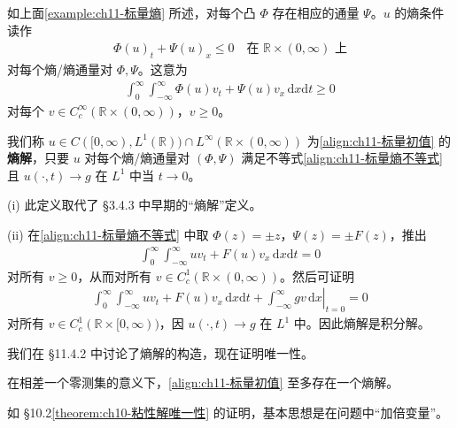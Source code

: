 \documentclass[../../main.tex]{subfiles}
\begin{document}
如上面\cref{example:ch11-标量熵} 所述，对每个凸 $\Phi$ 存在相应的通量 $\Psi$。$u$ 的熵条件读作
\begin{align*}
\Phi(u)_t+\Psi(u)_x\leqslant 0 \quad \text{在 } \mathbb{R}\times(0,\infty) \text{ 上}
\end{align*}
对每个熵/熵通量对 $\Phi,\Psi$。这意为
\begin{align}
\int_0^\infty\int_{-\infty}^\infty \Phi(u)v_t+\Psi(u)v_x\,\mathrm{d}x\mathrm{d}t\geqslant 0
\label{align:ch11-标量熵不等式}
\end{align}
对每个 $v\in C_c^\infty(\mathbb{R}\times(0,\infty))$，$v\geqslant 0$。

\begin{definition}\label{definition:ch11-标量熵解}
我们称 $u\in C([0,\infty),L^1(\mathbb{R}))\cap L^\infty(\mathbb{R}\times(0,\infty))$ 为\eqref{align:ch11-标量初值} 的\textbf{熵解}，只要 $u$ 对每个熵/熵通量对 $(\Phi,\Psi)$ 满足不等式\eqref{align:ch11-标量熵不等式} 且 $u(\cdot,t)\to g$ 在 $L^1$ 中当 $t\to 0$。
\end{definition}

\begin{remark}
(i) 此定义取代了 \S3.4.3 中早期的``熵解''定义。

(ii) 在\eqref{align:ch11-标量熵不等式} 中取 $\Phi(z)=\pm z$，$\Psi(z)=\pm F(z)$，推出
\begin{align*}
\int_0^\infty\int_{-\infty}^\infty uv_t+F(u)v_x\,\mathrm{d}x\mathrm{d}t=0
\end{align*}
对所有 $v\geqslant 0$，从而对所有 $v\in C_c^1(\mathbb{R}\times(0,\infty))$。然后可证明
\begin{align*}
\int_0^\infty\int_{-\infty}^\infty uv_t+F(u)v_x\,\mathrm{d}x\mathrm{d}t+\left.\int_{-\infty}^\infty gv\,\mathrm{d}x\right|_{t=0}=0
\end{align*}
对所有 $v\in C_c^1(\mathbb{R}\times[0,\infty))$，因 $u(\cdot,t)\to g$ 在 $L^1$ 中。因此熵解是积分解。
\end{remark}

我们在 \S11.4.2 中讨论了熵解的构造，现在证明唯一性。

\begin{theorem}[单个守恒律熵解的唯一性。]\label{theorem:ch11-标量熵解唯一性}在相差一个零测集的意义下，\eqref{align:ch11-标量初值} 至多存在一个熵解。
\end{theorem}

如 \S10.2\cref{theorem:ch10-粘性解唯一性} 的证明，基本思想是在问题中``加倍变量''。
\end{document}
